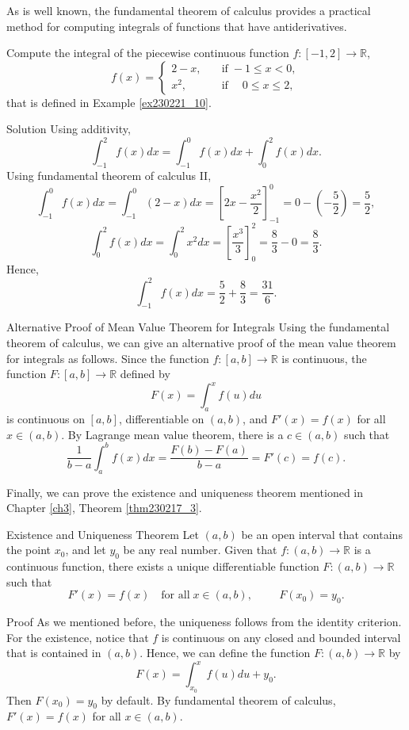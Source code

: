 \begin{example}[label=20230527]{}
As is well known, the fundamental theorem of calculus provides a practical method for computing integrals of  functions that have antiderivatives. 
\begin{example}
{}
Compute the integral of the piecewise continuous function   $f:[-1, 2]\to\mathbb{R}$,
\[f(x)=\begin{cases} 2-x,\quad &\text{if}\; -1\leq x<0,\\
x^2,\quad &\text{if}\; \quad 0\leq x\leq 2,\end{cases}\] that is defined in Example \ref{ex230221_10}. 
\end{example}
\begin{solution}{Solution}
Using additivity,
\[\int_{-1}^2f(x)dx=\int_{-1}^0f(x)dx+\int_0^2f(x)dx.\]
Using fundamental theorem of calculus II, 
\[\int_{-1}^0f(x)dx=\int_{-1}^0(2-x)dx=\left[2x-\frac{x^2}{2}\right]_{-1}^0=0-\left(-\frac{5}{2}\right)=\frac{5}{2},\]
\[\int_0^2f(x)dx=\int_0^2x^2dx=\left[\frac{x^3}{3}\right]_0^2=\frac{8}{3}-0=\frac{8}{3}.\]
Hence,
\[\int_{-1}^2f(x)dx=\frac{5}{2}+\frac{8}{3}=\frac{31}{6}.\]

\end{solution}

\begin{remark}{Alternative Proof of Mean Value Theorem for Integrals}
Using the fundamental theorem of calculus, we can give an alternative proof of the mean value theorem for integrals as follows. Since the function $f:[a,b]\to\mathbb{R}$ is continuous, the function $F:[a,b]\to\mathbb{R}$ defined by
\[F(x)=\int_a^xf(u)du\] is continuous on $[a,b]$, differentiable on $(a,b)$, and $F'(x)=f(x)$ for all $x\in (a,b)$. By Lagrange mean value theorem, there is a $c\in (a,b)$ such that
\[\frac{1}{b-a}\int_a^bf(x)dx=\frac{F(b)-F(a)}{b-a}=F'(c)=f(c).\]
 
\end{remark}

Finally, we can prove the existence and uniqueness theorem mentioned in Chapter \ref{ch3}, Theorem \ref{thm230217_3}.
\begin{theorem}[label=thm230222_13]{Existence and Uniqueness Theorem}
Let $(a,b)$ be an open interval that contains the point $x_0$, and let $y_0$ be any real number.  Given that $f:(a,b)\to\mathbb{R}$ is a continuous function, there exists a unique differentiable function $F:(a,b)\to\mathbb{R}$ such that \[F'(x)=f(x)\quad \text{for all}\;x\in (a, b), \hspace{1cm}F(x_0)=y_0.\]
\end{theorem}
\begin{myproof}{Proof}
As we mentioned before, the uniqueness follows from the identity criterion. For the existence, notice that $f$ is continuous on any closed and bounded interval that is contained in $(a,b)$. Hence, we can define the function $F:(a,b)\to\mathbb{R}$ by
\[F(x)=\int_{x_0}^xf(u)du+y_0.\] 
Then $F(x_0)=y_0$ by default. By fundamental theorem of calculus, $F'(x)=f(x)$ for all $x\in (a,b)$.
\end{myproof}



\end{example}
